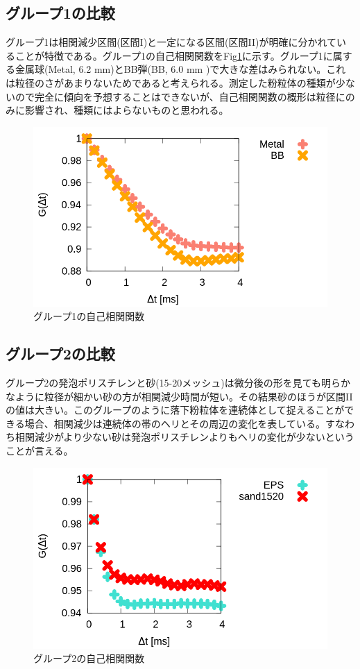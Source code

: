 \documentclass[a4j,12pt,dvipdfmx]{jsarticle}
\newcommand{\II}{I\hspace{-.1em}I}
\begin{document}
\subsection{グループ1の比較}
グループ1は相関減少区間(区間I)と一定になる区間(区間\II )が明確に分かれていることが特徴である。グループ1の自己相関関数をFig\ref{fig:one}に示す。グループ1に属する金属球(Metal, 6.2 mm)とBB弾(BB, 6.0 mm )で大きな差はみられない。これは粒径のさがあまりないためであると考えられる。測定した粉粒体の種類が少ないので完全に傾向を予想することはできないが、自己相関関数の概形は粒径にのみに影響され、種類にはよらないものと思われる。
\begin{figure}[H]
	\includegraphics[scale=0.4]{one.png}
	\caption{グループ1の自己相関関数}
	\label{fig:one}
\end{figure}
\subsection{グループ2の比較}
グループ2の発泡ポリスチレンと砂(15-20メッシュ)は微分後の形を見ても明らかなように粒径が細かい砂の方が相関減少時間が短い。その結果砂のほうが区間\II の値は大きい。このグループのように落下粉粒体を連続体として捉えることができる場合、相関減少は連続体の帯のヘリとその周辺の変化を表している。すなわち相関減少がより少ない砂は発泡ポリスチレンよりもヘリの変化が少ないということが言える。
\begin{figure}[H]
	\includegraphics[scale=0.4]{two_big.png}
	\caption{グループ2の自己相関関数}
	\label{fig:two}
\end{figure}
\end{document}
